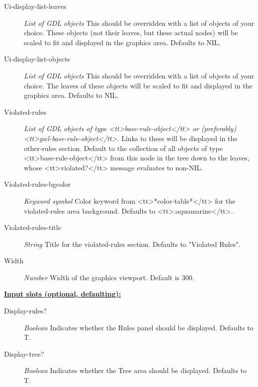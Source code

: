\documentclass [11pt]{book}
\begin{document}
\begin{itemize}
\begin{description}
\item [Ui-display-list-leaves]
\emph{List of GDL objects} This should be overridden with a list of objects of your choice. These objects (not their leaves,
but these actual nodes) will be scaled to fit and displayed in the graphics area. Defaults to NIL.


\item [Ui-display-list-objects]
\emph{List of GDL objects} This should be overridden with a list of objects of your choice. The leaves of these objects will
be scaled to fit and displayed in the graphics area. Defaults to NIL.


\item [Violated-rules]
\emph{List of GDL objects of type <tt>base-rule-object</tt> or (preferably) <tt>gwl-base-rule-object</tt>}.
Links to these will be displayed in the other-rules section. Default to the collection of all objects of type
<tt>base-rule-object</tt> from this node in the tree down to the leaves, whose <tt>violated?</tt> message
evaluates to non-NIL.


\item [Violated-rules-bgcolor]
\emph{Keyword symbol} Color keyword from <tt>*color-table*</tt> for the violated-rules area background. Defaults to <tt>:aquamarine</tt>.


\item [Violated-rules-title]
\emph{String} Title for the violated-rules section. Defaults to "Violated Rules".


\item [Width]
\emph{Number} Width of the graphics viewport. Default is 300.


\end{description}






\textbf{
\underline{Input slots (optional, defaulting):}}

\begin{description}

\item [Display-rules?]
\emph{Boolean} Indicates whether the Rules panel should be displayed. Defaults to T.


\item [Display-tree?]
\emph{Boolean} Indicates whether the Tree area should be displayed. Defaults to T.



\end{description}
\end{itemize}
\end{document}
